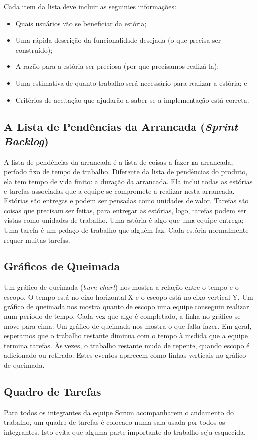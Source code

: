 Cada item da lista deve incluir as seguintes informações:
\begin{itemize}
\item Quais usuários vão se beneficiar da estória;
\item Uma rápida descrição da funcionalidade desejada (o que precisa ser construído);
\item A razão para a estória ser preciosa (por que precisamos realizá-la);
\item Uma estimativa de quanto trabalho será necessário para realizar a estória; e
\item Critérios de aceitação que ajudarão a saber se a implementação está correta.
\end{itemize}

\subsection{A Lista de Pendências da Arrancada (\emph{Sprint Backlog})}
A lista de pendências da arrancada é a lista de coisas a fazer na arrancada, período fixo de tempo de trabalho. Diferente da lista de pendências do produto, ela tem tempo de vida finito: a duração da arrancada. Ela inclui todas as estórias e tarefas associadas que a equipe se compromete a realizar nesta arrancada. Estórias são entregas e podem ser pensadas como unidades de valor. Tarefas são coisas que precisam ser feitas, para entregar as estórias, logo, tarefas podem ser vistas como unidades de trabalho. Uma estória é algo que uma equipe entrega; Uma tarefa é um pedaço de trabalho que alguém faz. Cada estória normalmente requer muitas tarefas.

\subsection{Gráficos de Queimada}
Um gráfico de queimada (\emph{burn chart}) nos mostra a relação entre o tempo e o escopo. O tempo está no eixo horizontal X e o escopo está no eixo vertical Y. Um gráfico de queimada nos mostra quanto de escopo uma equipe conseguiu realizar num período de tempo. Cada vez que algo é completado, a linha no gráfico se move para cima. Um gráfico de queimada nos mostra o que falta fazer. Em geral, esperamos que o trabalho restante diminua com o tempo à medida que a equipe termina tarefas. Às vezes, o trabalho restante muda de repente, quando escopo é adicionado ou retirado. Estes eventos aparecem como linhas verticais no gráfico de queimada.

\subsection{Quadro de Tarefas}
Para todos os integrantes da equipe Scrum acompanharem o andamento do trabalho, um quadro de tarefas é colocado numa sala usada por todos os integrantes. Isto evita que alguma parte importante do trabalho seja esquecida.

